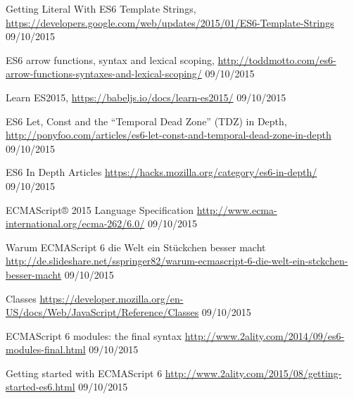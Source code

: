 \documentclass{bioinfo}
\begin{document}
\begin{thebibliography}{}
    Getting Literal With ES6 Template Strings, \url{https://developers.google.com/web/updates/2015/01/ES6-Template-Strings} 09/10/2015

    ES6 arrow functions, syntax and lexical scoping, \url{http://toddmotto.com/es6-arrow-functions-syntaxes-and-lexical-scoping/} 09/10/2015

    Learn ES2015, \url{https://babeljs.io/docs/learn-es2015/} 09/10/2015

    ES6 Let, Const and the “Temporal Dead Zone” (TDZ) in Depth, \url{http://ponyfoo.com/articles/es6-let-const-and-temporal-dead-zone-in-depth} 09/10/2015

    ES6 In Depth Articles \url{https://hacks.mozilla.org/category/es6-in-depth/} 09/10/2015

    ECMAScript® 2015 Language Specification \url{http://www.ecma-international.org/ecma-262/6.0/} 09/10/2015

    Warum ECMAScript 6 die Welt ein Stückchen besser macht \url{http://de.slideshare.net/sspringer82/warum-ecmascript-6-die-welt-ein-stckchen-besser-macht} 09/10/2015

    Classes \url{https://developer.mozilla.org/en-US/docs/Web/JavaScript/Reference/Classes} 09/10/2015

    ECMAScript 6 modules: the final syntax \url{http://www.2ality.com/2014/09/es6-modules-final.html} 09/10/2015

    Getting started with ECMAScript 6 \url{http://www.2ality.com/2015/08/getting-started-es6.html} 09/10/2015

\end{thebibliography}
\end{document}
